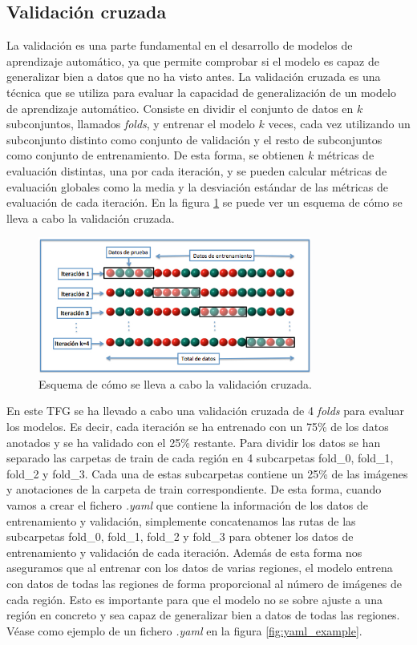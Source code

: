 \subsection{Validación cruzada}
La validación es una parte fundamental en el desarrollo de modelos de aprendizaje automático, ya que permite comprobar si el modelo es capaz de generalizar bien a datos que no ha visto antes. La validación cruzada es una técnica que se utiliza para evaluar la capacidad de generalización de un modelo de aprendizaje automático. Consiste en dividir el conjunto de datos en $k$ subconjuntos, llamados \textit{folds}, y entrenar el modelo $k$ veces, cada vez utilizando un subconjunto distinto como conjunto de validación y el resto de subconjuntos como conjunto de entrenamiento. De esta forma, se obtienen $k$ métricas de evaluación distintas, una por cada iteración, y se pueden calcular métricas de evaluación globales como la media y la desviación estándar de las métricas de evaluación de cada iteración. En la figura \ref{fig:cross_validation} se puede ver un esquema de cómo se lleva a cabo la validación cruzada.

\begin{figure}[H]
    \centering
    \includegraphics[width=0.8\textwidth]{img/K-fold_cross_validation.jpg}
    \caption{Esquema de cómo se lleva a cabo la validación cruzada. \cite{KFoldCV_image}}
    \label{fig:cross_validation}
\end{figure}

En este TFG se ha llevado a cabo una validación cruzada de 4 \textit{folds} para evaluar los modelos. Es decir, cada iteración se ha entrenado con un 75\% de los datos anotados y se ha validado con el 25\% restante. Para dividir los datos se han separado las carpetas de train de cada región en 4 subcarpetas fold\_0, fold\_1, fold\_2 y fold\_3. Cada una de estas subcarpetas contiene un 25\% de las imágenes y anotaciones de la carpeta de train correspondiente. De esta forma, cuando vamos a crear el fichero \textit{.yaml} que contiene la información de los datos de entrenamiento y validación, simplemente concatenamos las rutas de las subcarpetas fold\_0, fold\_1, fold\_2 y fold\_3 para obtener los datos de entrenamiento y validación de cada iteración. Además de esta forma nos aseguramos que al entrenar con los datos de varias regiones, el modelo entrena con datos de todas las regiones de forma proporcional al número de imágenes de cada región. Esto es importante para que el modelo no se sobre ajuste a una región en concreto y sea capaz de generalizar bien a datos de todas las regiones. Véase como ejemplo de un fichero \textit{.yaml} en la figura \ref{fig:yaml_example}.

